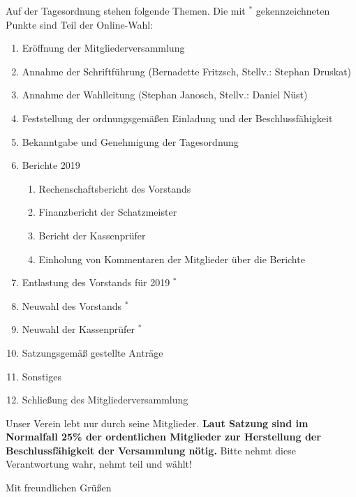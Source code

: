 \documentclass[../Vorlagen/de-RSE_Brief,a4paper]{scrlttr2}
\begin{document}
\begin{letter}{\mbox{}
}
\clearpage
\vspace{2em}
Auf der Tagesordnung stehen folgende Themen. Die mit ${}^*$ gekennzeichneten Punkte sind Teil der Online-Wahl:
\begin{enumerate}
\setlength\itemsep{0em}
\item Eröffnung der Mitgliederversammlung
\item Annahme der Schriftführung (Bernadette Fritzsch, Stellv.: Stephan Druskat)
\item Annahme der Wahlleitung (Stephan Janosch, Stellv.: Daniel Nüst)
\item Feststellung der ordnungsgemäßen Einladung und der Beschlussfähigkeit
\item Bekanntgabe und Genehmigung der Tagesordnung
\item Berichte 2019
\begin{enumerate}
 \item Rechenschaftsbericht des Vorstands
 \item Finanzbericht der Schatzmeister
 \item Bericht der Kassenprüfer
 \item Einholung von Kommentaren der Mitglieder über die Berichte
\end{enumerate}
\item Entlastung des Vorstands für 2019 ${}^*$
\item Neuwahl des Vorstands ${}^*$
\item Neuwahl der Kassenprüfer ${}^*$
\item Satzungsgemäß gestellte Anträge
\item Sonstiges
\item Schließung des Mitgliederversammlung
\end{enumerate}

Unser Verein lebt nur durch seine Mitglieder.
\textbf{Laut Satzung sind im Normalfall 25\% der ordentlichen Mitglieder zur Herstellung der Beschlussfähigkeit der Versammlung nötig.}
Bitte nehmt diese Verantwortung wahr, nehmt teil und wählt!

\closing{Mit freundlichen Grüßen}
\end{letter}
\end{document}
